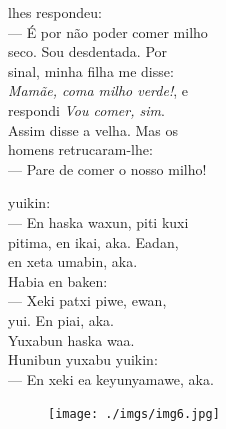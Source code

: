 
 lhes respondeu:\\
--- É por não poder comer milho\\
seco. Sou desdentada. Por\\
sinal, minha filha me disse:\\
\textit{Mamãe, coma milho verde!}, e\\
respondi \textit{Vou comer, sim}.\\
Assim disse a velha. Mas os\\
homens retrucaram-lhe:\\
--- Pare de comer o nosso milho!

\vspace{2em}

 yuikin:\\
--- En haska waxun, piti kuxi\\
pitima, en ikai, aka. Eadan,\\
en xeta umabin, aka.\\
Habia en baken:\\
--- Xeki patxi piwe, ewan,\\
yui. En piai, aka.\\
Yuxabun haska waa.\\
Hunibun yuxabu yuikin:\\
--- En xeki ea keyunyamawe, aka.

\vspace*{\fill}

\pagebreak
\thispagestyle{empty}
\begin{figure}
\vspace*{-1.6cm}
\hspace*{-2.2cm}\texttt{[image: ./imgs/img6.jpg]}
\end{figure}

